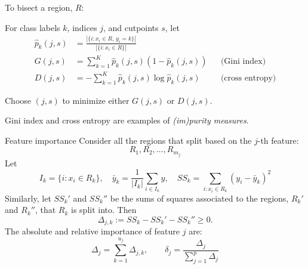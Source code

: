 \documentclass{beamer}
\begin{document}
\begin{frame}{}
    To bisect a region, $R$:

    For class labels $k$, indices $j$, and cutpoints $s$, let
    \begin{align*}
        \hat p_k(j, s) &= \frac{|\{i : x_i\in R,\, y_i=k\}|}{|\{i : x_i\in R\}|}\\
        G(j, s) &= \sum_{k=1}^K \hat p_k(j, s)(1 - \hat p_k(j, s)) &&\text{(Gini index)}\\
        D(j, s) &= -\sum_{k=1}^K \hat p_k(j, s)\log \hat p_k(j, s) &&\text{(cross entropy)}
    \end{align*}

    Choose $(j, s)$ to minimize either $G(j, s)$ or $D(j, s)$.

    Gini index and cross entropy are examples of \emph{(im)purity measures}.
\end{frame}

\begin{frame}{Feature importance}
Consider all the regions that split based on the $j$-th feature:
\[
    R_1,R_2,\ldots,R_{m_j}
\]
Let
\[
 I_k = \{i : x_i\in R_k\},\quad \bar y_k = \frac1{|I_k|}\sum_{i\in I_k} y,
 \quad SS_k = \sum_{i:x_i\in R_k}(y_i - \bar y_k)^2
 \]
Similarly, let $SS_k'$ and $SS_k''$ be the sums of squares associated to the regions, $R_k'$ and $R_k''$, that $R_k$ is split into.
Then
\[
    \Delta_{j, k} := SS_k - SS_k' - SS_k'' \geq 0.
\]
The absolute and relative importance of feature $j$ are:
\[
\Delta_j = \sum_{k=1}^{u_j} \Delta_{j, k},\qquad \delta_j = \frac{\Delta_j}{\sum_{j=1}^p \Delta_j}
\]
\end{frame}
\end{document}
